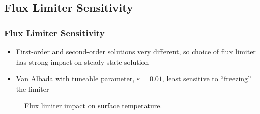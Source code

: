 \documentclass{beamer}
\begin{document}
\subsection{Flux Limiter Sensitivity}
\begin{frame}
  \frametitle{Flux Limiter Sensitivity}
  \begin{itemize}
    \item First-order and second-order solutions very different, so
      choice of flux limiter has strong impact on steady state solution
    \item Van Albada with tuneable parameter, $\varepsilon = 0.01$, least
      sensitive to ``freezing'' the limiter
  \end{itemize}
  \vspace{-0.5cm}
\begin{figure}[h]
  \centering
  \caption{Flux limiter impact on surface temperature.}
  \label{fig:vl-va-impact}
\end{figure}
\end{frame}
\end{document}
